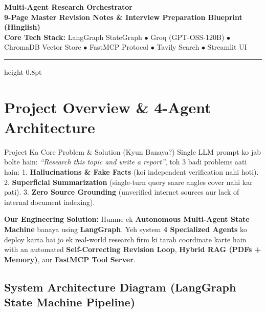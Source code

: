 \documentclass[9.5pt, a4paper]{article}
\begin{document}
\begin{center}
    {\LARGE\bfseries\color{primary}  Multi-Agent Research Orchestrator}\\[2pt]
    {\normalsize\bfseries\color{secondary} 9-Page Master Revision Notes \& Interview Preparation Blueprint (Hinglish)}\\[1pt]
    {\scriptsize\textbf{Core Tech Stack:} LangGraph StateGraph $\bullet$ Groq (GPT-OSS-120B) $\bullet$ ChromaDB Vector Store $\bullet$ FastMCP Protocol $\bullet$ Tavily Search $\bullet$ Streamlit UI}
\end{center}
\vspace{-6pt}
\hrule height 0.8pt
\vspace{4pt}

\section{Project Overview \& 4-Agent Architecture}

\begin{conceptbox}{Project Ka Core Problem \& Solution (Kyun Banaya?)}
Single LLM prompt ko jab bolte hain: \textit{``Research this topic and write a report''}, toh 3 badi problems aati hain:
1. \textbf{Hallucinations \& Fake Facts} (koi independent verification nahi hoti). 
2. \textbf{Superficial Summarization} (single-turn query saare angles cover nahi kar pati). 
3. \textbf{Zero Source Grounding} (unverified internet sources aur lack of internal document indexing).

\textbf{Our Engineering Solution:} Humne ek \textbf{Autonomous Multi-Agent State Machine} banaya using \textbf{LangGraph}. Yeh system \textbf{4 Specialized Agents} ko deploy karta hai jo ek real-world research firm ki tarah coordinate karte hain with an automated \textbf{Self-Correcting Revision Loop}, \textbf{Hybrid RAG (PDFs + Memory)}, aur \textbf{FastMCP Tool Server}.
\end{conceptbox}

\vspace{-4pt}
\subsection{System Architecture Diagram (LangGraph State Machine Pipeline)}
\vspace{-2pt}
\end{document}

